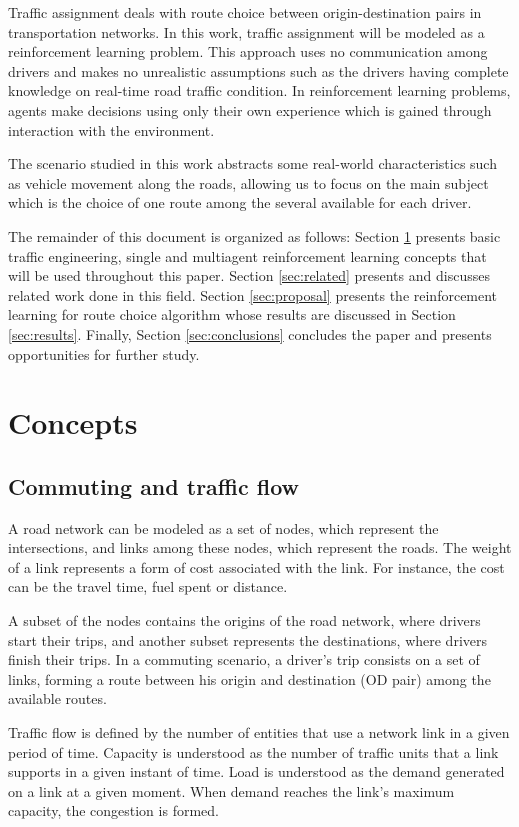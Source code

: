 \documentclass[12pt]{article}
\begin{document}
Traffic assignment deals with route choice between origin-destination pairs in transportation networks. In this work, traffic assignment will be modeled as a reinforcement learning problem. This approach uses no communication among drivers and makes no unrealistic assumptions such as the drivers having complete knowledge on real-time road traffic condition. In reinforcement learning problems, agents make decisions using only their own experience which is gained through interaction with the environment.

The scenario studied in this work abstracts some real-world characteristics such as vehicle movement along the roads, allowing us to focus on the main subject which is the choice of one route among the several available for each driver.

The remainder of this document is organized as follows: Section \ref{sec:concepts} presents basic traffic engineering, single and multiagent reinforcement learning concepts that will be used throughout this paper. Section \ref{sec:related} presents and discusses related work done in this field. Section \ref{sec:proposal} presents the reinforcement learning for route choice algorithm whose results are discussed in Section \ref{sec:results}. Finally, Section \ref{sec:conclusions} concludes the paper and presents opportunities for further study.

\section{Concepts}
\label{sec:concepts}
\subsection{Commuting and traffic flow}

A road network can be modeled as a set of nodes, which represent the intersections, and links among these nodes, which represent the roads. The weight of a link represents a form of cost associated with the link. For instance, the cost can be the travel time, fuel spent or distance.

A subset of the nodes contains the origins of the road network, where drivers start their trips, and another subset represents the destinations, where drivers finish their trips. In a commuting scenario, a driver's trip consists on a set of links, forming a route between his origin and destination (OD pair) among the available routes.

Traffic flow is defined by the number of entities that use a network link in a given period of time. Capacity is understood as the number of traffic units that a link supports in a given instant of time. Load is understood as the demand generated on a link at a given moment. When demand reaches the link's maximum capacity, the congestion is formed.
\end{document}
